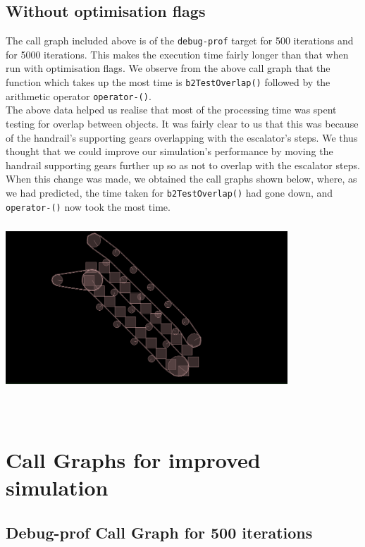 \documentclass[11pt]{article}
\begin{document}
	\subsection{Without optimisation flags}
	The call graph included above is of the \texttt{debug-prof} target for 500 iterations and for 5000 iterations. This makes the execution time fairly longer than that when run with optimisation flags. We observe from the above call graph that the function which takes up the most time is \texttt{b2TestOverlap()} followed by the arithmetic operator \texttt{operator-()}.\\

	The above data helped us realise that most of the processing time was spent testing for overlap between objects. It was fairly clear to us that this was because of the handrail's supporting gears overlapping with the escalator's steps. We thus thought that we could improve our simulation's performance by moving the handrail supporting gears further up so as not to overlap with the escalator steps. When this change was made, we obtained the call graphs shown below, where, as we had predicted, the time taken for \texttt{b2TestOverlap()} had gone down, and \texttt{operator-()} now took the most time.\\

	\includegraphics[width=300pt, height=200pt]{../plots/simulation.png}\\\\

\section{Call Graphs for improved simulation}

	\subsection{Debug-prof Call Graph for 500 iterations}
\end{document}
